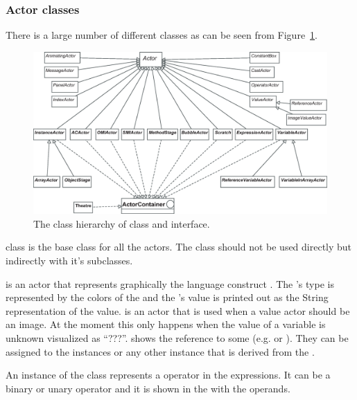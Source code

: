\subsubsection{Actor classes}
\label{sec:Actors}

There is a large number of different  classes as can be seen from Figure~\ref{fig:class_hierarchy_of_Actor_class_small}. 

\begin{figure}[!htb]
\begin{center}
\includegraphics[width=\textwidth]{images/jeliot_actor_class_small.eps}
\caption{The class hierarchy of  class and  interface.}
\label{fig:class_hierarchy_of_Actor_class_small}
\end{center}
\end{figure}

 class is the base class for all the actors. The  class should not be used directly but indirectly with it's subclasses. 

 is an actor that represents graphically the language construct . The 's type is represented by the colors of the  and the 's value is printed out as the String representation of the value.  is an actor that is used when a value actor should be an image. At the moment this only happens when the value of a variable is unknown visualized as ``???''.  shows the reference to some  (e.g.  or ). They can be assigned to the  instances or any other instance that is derived from the .

An instance of the  class represents a operator in  the expressions. It can be a binary or unary operator and it is shown in the  with the operands. 

